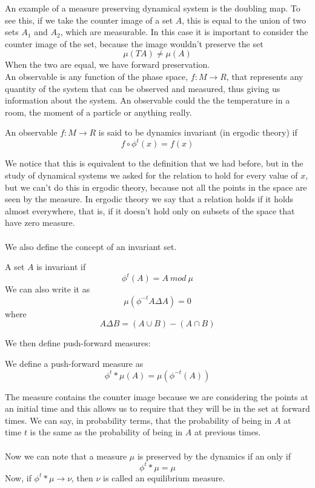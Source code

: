 An example of a measure preserving dynamical system is the doubling map. To see this, if we take the counter image of a set $A$, this is equal to the union of two sets $A_1$ and $A_2$, which are measurable. In this case it is important to consider the counter image of the set, because the image wouldn't preserve the set
$$
	\mu(TA) \neq \mu(A)
$$
When the two are equal, we have forward preservation. \\
An observable is any function of the phase space, $f:M \rightarrow R$, that represents any quantity of the system that can be observed and measured, thus giving us information about the system. An observable could the the temperature in a room, the moment of a particle or anything really.
\begin{definition}
	An observable $f:M \rightarrow R$ is said to be dynamics invariant (in ergodic theory) if
	$$
		f \circ \phi^t(x) = f(x)
	$$
\end{definition}
We notice that this is equivalent to the definition that we had before, but in the study of dynamical systems we asked for the relation to hold for every value of $x$, but we can't do this in ergodic theory, because not all the points in the space are seen by the measure. In ergodic theory we say that a relation holds if it holds almost everywhere, that is, if it doesn't hold only on subsets of the space that have zero measure. \\ \\
We also define the concept of an invariant set.
\begin{definition}
	A set $A$ is invariant if
	$$
		\phi^t(A) = A \ mod \ \mu
	$$
	We can also write it as
	$$
		\mu(\phi^{-t}A \Delta A) = 0
	$$
	where 
	$$
		A \Delta B = (A\cup B) - (A \cap B)
	$$
\end{definition}
We then define push-forward measures:
\begin{definition}
	We define a push-forward measure as
	$$
		\phi^t * \mu(A) = \mu(\phi^{-t}(A))
	$$
\end{definition}
The measure contains the counter image because we are considering the points at an initial time and this allows us to require that they will be in the set at forward times. We can say, in probability terms, that the probability of being in $A$ at time $t$ is the same as the probability of being in $A$ at previous times. \\ \\	
Now we can note that a measure $\mu$ is preserved by the dynamics if an only if
$$
	\phi^t * \mu = \mu
$$
Now, if $\phi^t * \mu \rightarrow \nu$, then $\nu$ is called an equilibrium measure.
